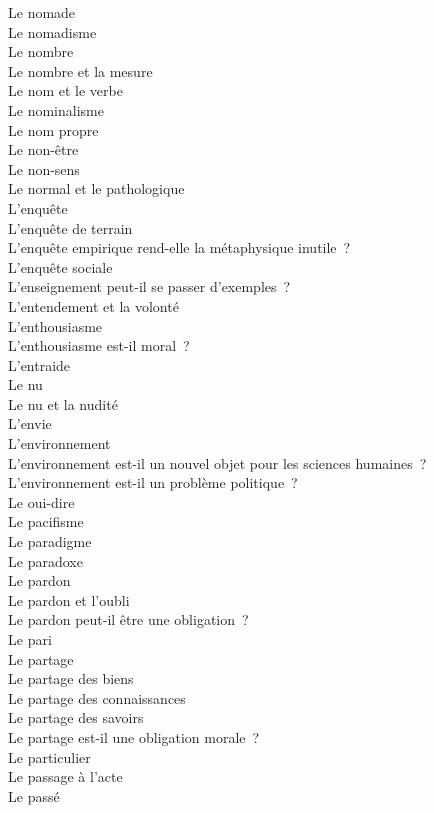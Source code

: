 \documentclass[a4paper,12pt]{article}
\begin{document}
Le nomade \\
Le nomadisme \\
Le nombre \\
Le nombre et la mesure \\
Le nom et le verbe \\
Le nominalisme \\
Le nom propre \\
Le non-être \\
Le non-sens \\
Le normal et le pathologique \\
L'enquête \\
L'enquête de terrain \\
L'enquête empirique rend-elle la métaphysique inutile ? \\
L'enquête sociale \\
L'enseignement peut-il se passer d'exemples ? \\
L'entendement et la volonté \\
L'enthousiasme \\
L'enthousiasme est-il moral ? \\
L'entraide \\
Le nu \\
Le nu et la nudité \\
L'envie \\
L'environnement \\
L'environnement est-il un nouvel objet pour les sciences humaines ? \\
L'environnement est-il un problème politique ? \\
Le oui-dire \\
Le pacifisme \\
Le paradigme \\
Le paradoxe \\
Le pardon \\
Le pardon et l'oubli \\
Le pardon peut-il être une obligation ? \\
Le pari \\
Le partage \\
Le partage des biens \\
Le partage des connaissances \\
Le partage des savoirs \\
Le partage est-il une obligation morale ? \\
Le particulier \\
Le passage à l'acte \\
Le passé \\
\end{document}
